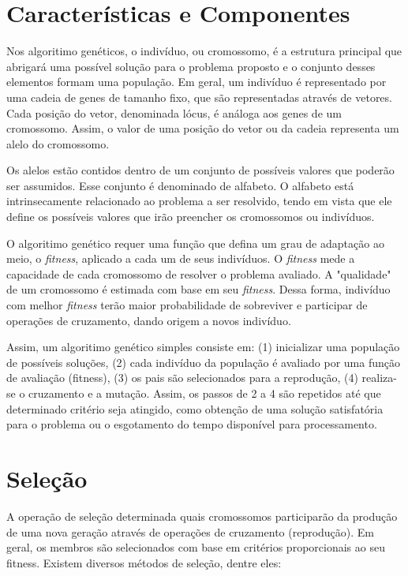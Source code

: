 \documentclass[12pt]{article}
\begin{document}
\section{Características e Componentes}
Nos algoritimo genéticos, o indivíduo, ou cromossomo, é a estrutura principal que abrigará
uma possível solução para o problema proposto e o conjunto desses elementos formam uma
população. Em geral, um indivíduo é representado por uma cadeia de genes de tamanho fixo,
que são representadas através de vetores. Cada posição do vetor, denominada lócus, é
análoga aos genes de um cromossomo. Assim, o valor de uma posição do vetor ou da cadeia
representa um alelo do cromossomo.

Os alelos estão contidos dentro de um conjunto de possíveis valores que poderão ser assumidos.
Esse conjunto é denominado de alfabeto. O alfabeto está intrinsecamente relacionado ao problema
a ser resolvido, tendo em vista que ele define os possíveis valores que irão preencher os
cromossomos ou indivíduos.

O algoritimo genético requer uma função que defina um grau de adaptação ao meio, o
\textit{fitness}, aplicado a cada um de seus indivíduos. O \textit{fitness} mede a capacidade
de cada cromossomo de resolver o problema avaliado. A "qualidade" de um cromossomo é estimada
com base em seu \textit{fitness}. Dessa forma, indivíduo com melhor \textit{fitness} terão maior
probabilidade de sobreviver e participar de operações de cruzamento, dando origem a novos
indivíduo.

Assim, um algoritimo genético simples consiste em: (1) inicializar uma população de
possíveis soluções, (2) cada indivíduo da população é avaliado por uma função de avaliação
(fitness), (3) os pais são selecionados para a reprodução, (4) realiza-se o cruzamento e a
mutação. Assim, os passos de 2 a 4 são repetidos até que determinado critério seja atingido,
como obtenção de uma solução satisfatória para o problema ou o esgotamento do tempo disponível
para processamento.

\section{Seleção}
A operação de seleção determinada quais cromossomos participarão da produção de uma nova geração
através de operações de cruzamento (reprodução). Em geral, os membros são selecionados com base
em critérios proporcionais ao seu fitness. Existem diversos métodos de seleção, dentre eles:
\end{document}
